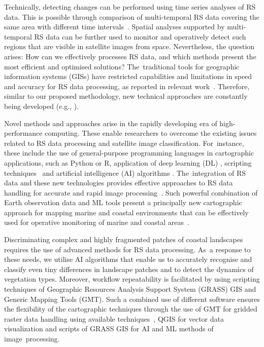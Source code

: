 \documentclass[jmse,article,accept,pdftex,oneauthor]{Definitions/mdpi}
\begin{document}
Technically, detecting changes can be performed using time series analyses of RS data{. This is possible }through comparison of multi-temporal RS data covering the same area with different time intervals~\cite{GAO2024119622,Vasquez2023,MASRIA2024103502}. Spatial analyses supported by{ }multi-temporal RS data can be {further} used to monitor and operatively detect such regions that are visible in satellite images from space. {Nevertheless, the} question arises: How can we effectively processes RS data, and which methods present the most efficient {and optimised} solutions? The~traditional tools for geographic information systems (GISs) have restricted capabilities and limitations in speed and accuracy for RS data processing, as reported in relevant work~\cite{BLACKFORD1995247,Whig2024,Rolim2023}. {Therefore, }similar to our %
proposed methodology{, new technical approaches are} constantly being developed (e.g., \cite{BUGNOT2018939}). 

Novel methods and approaches {arise} in the rapidly developing {era} of {high-performance} computing{. These enable} researchers %
to overcome the {existing} issues related to RS data processing{ and satellite image classification. For~instance,} these include{ }the use of general-purpose programming languages {in cartographic applications, }such as Python or R, application of deep learning (DL) \cite{Park,Roselin}, scripting techniques~\cite{Lemenkova202212,Lemenkova202213} and artificial intelligence (AI) algorithms \cite{rs11060617,Lemenkova202211}. The~integration of RS data and these new technologies provides effective approaches to RS data handling for accurate and rapid image processing~\cite{Turnbull,Lemenkova202323}. {Such} powerful combination of Earth observation data and ML tools{ }present a principally new cartographic approach for mapping marine and coastal environments{ that can be effectively used }for {operative }monitoring of marine and coastal areas~\cite{Cao2022}.

Discriminating complex and highly fragmented patches of coastal landscapes requires the use of advanced methods for RS data processing. As~a response to these needs, we utilise AI algorithms that enable us to accurately recognise and classify even tiny differences in landscape patches and to detect the dynamics of vegetation types. Moreover, workflow repeatability is facilitated by using scripting techniques of {Geographic Resources Analysis Support System (}GRASS) GIS and {Generic Mapping Tools (}GMT{)}. Such a combined use of different software ensures the flexibility of the cartographic techniques through the use of GMT for gridded raster data handling using available techniques~\cite{Lemenkova202217}, QGIS for vector data visualization and scripts of GRASS GIS for AI and ML methods of image~processing. 
\end{document}
